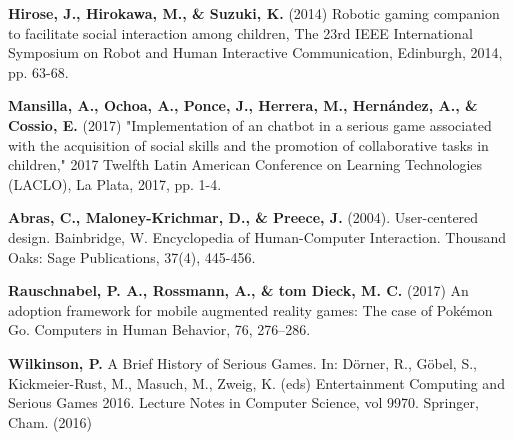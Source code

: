 \documentclass[runningheads]{llncs}
\begin{document}
\begin{thebibliography}{8}
 \textbf{Hirose, J., Hirokawa, M., \& Suzuki, K.} (2014) Robotic gaming companion to facilitate social interaction among children, The 23rd IEEE International Symposium on Robot and Human Interactive Communication, Edinburgh, 2014, pp. 63-68. 

 \textbf{Mansilla, A., Ochoa, A., Ponce, J., Herrera, M., Hernández, A., \& Cossio, E.} (2017) "Implementation of an chatbot in a serious game associated with the acquisition of social skills and the promotion of collaborative tasks in children," 2017 Twelfth Latin American Conference on Learning Technologies (LACLO), La Plata, 2017, pp. 1-4.

 \textbf{Abras, C., Maloney-Krichmar, D., \& Preece, J.} (2004). User-centered design. Bainbridge, W. Encyclopedia of Human-Computer Interaction. Thousand Oaks: Sage Publications, 37(4), 445-456.

 \textbf{Rauschnabel, P. A., Rossmann, A., \& tom Dieck, M. C.} (2017) An adoption framework for mobile augmented reality games: The case of Pokémon Go. Computers in Human Behavior, 76, 276–286. 

 \textbf{Wilkinson, P.} A Brief History of Serious Games. In: Dörner, R., Göbel, S., Kickmeier-Rust, M., Masuch, M., Zweig, K. (eds) Entertainment Computing and Serious Games 2016. Lecture Notes in Computer Science, vol 9970. Springer, Cham. (2016) 







\end{thebibliography}
\end{document}
